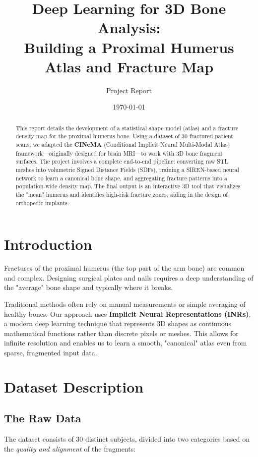 \documentclass[12pt]{article}
\title{\textbf{Deep Learning for 3D Bone Analysis:}\\ Building a Proximal Humerus Atlas and Fracture Map}
\author{Project Report}
\date{\today}
\begin{document}
\maketitle
\tableofcontents
\newpage

\begin{abstract}
This report details the development of a statistical shape model (atlas) and a fracture density map for the proximal humerus bone. Using a dataset of 30 fractured patient scans, we adapted the \textbf{CINeMA} (Conditional Implicit Neural Multi-Modal Atlas) framework—originally designed for brain MRI—to work with 3D bone fragment surfaces. The project involves a complete end-to-end pipeline: converting raw STL meshes into volumetric Signed Distance Fields (SDFs), training a SIREN-based neural network to learn a canonical bone shape, and aggregating fracture patterns into a population-wide density map. The final output is an interactive 3D tool that visualizes the "mean" humerus and identifies high-risk fracture zones, aiding in the design of orthopedic implants.
\end{abstract}

\section{Introduction}
Fractures of the proximal humerus (the top part of the arm bone) are common and complex. Designing surgical plates and nails requires a deep understanding of the "average" bone shape and typically where it breaks. 

Traditional methods often rely on manual measurements or simple averaging of healthy bones. Our approach uses \textbf{Implicit Neural Representations (INRs)}, a modern deep learning technique that represents 3D shapes as continuous mathematical functions rather than discrete pixels or meshes. This allows for infinite resolution and enables us to learn a smooth, "canonical" atlas even from sparse, fragmented input data.

\section{Dataset Description}

\subsection{The Raw Data}
The dataset consists of 30 distinct subjects, divided into two categories based on the \textit{quality and alignment} of the fragments:
\end{document}
